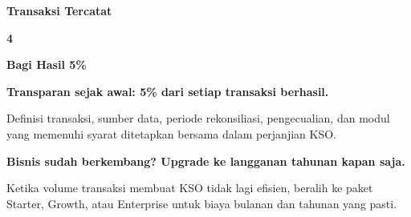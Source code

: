 \documentclass[a4paper]{article}
\begin{document}
\begin{center}
\begin{minipage}[t]{0.23\textwidth}
{\begin{minipage}[t][3.45cm][c]{\dimexpr\linewidth-2\fboxsep\relax}
            \begin{center}{\fontsize{9.5}{12}\selectfont\bfseries\color{BlueDark} Transaksi Tercatat}\par{}\end{center}
        \end{minipage}}%
\end{minipage}%
\hfill
\begin{minipage}[t]{0.23\textwidth}
    \colorbox{EmeraldBg}{%
        \begin{minipage}[t][3.45cm][c]{\dimexpr\linewidth-2\fboxsep\relax}
            \begin{center}{\fontsize{20}{24}\selectfont\bfseries\color{EmeraldPrimary} 4}\end{center}\vspace{2pt}
            \begin{center}{\fontsize{9.5}{12}\selectfont\bfseries\color{EmeraldDark} Bagi Hasil 5\%}\par{}\end{center}
        \end{minipage}}%
\end{minipage}
\end{center}

\vspace{8pt}

{\setlength{\fboxsep}{8pt}\setlength{\fboxrule}{0pt}%
\noindent\colorbox{BluePrimary}{%
    \begin{minipage}{\dimexpr\textwidth-2\fboxsep\relax}
        \centering
        {\fontsize{9.5}{12}\selectfont\bfseries\color{White} Transparan sejak awal: 5\% dari setiap transaksi berhasil.}\par\vspace{2pt}
        {\fontsize{8.5}{11}\selectfont\color{BlueMid} Definisi transaksi, sumber data, periode rekonsiliasi, pengecualian, dan modul yang memenuhi syarat ditetapkan bersama dalam perjanjian KSO.}
    \end{minipage}}}

\vspace{8pt}

{\setlength{\fboxsep}{8pt}\setlength{\fboxrule}{0pt}%
\noindent\colorbox{EmeraldBg}{%
    \begin{minipage}{\dimexpr\textwidth-2\fboxsep\relax}
        \centering
        {\fontsize{9}{12}\selectfont\bfseries\color{EmeraldDark} Bisnis sudah berkembang? Upgrade ke langganan tahunan kapan saja.}\par\vspace{1pt}
        {\fontsize{8.5}{11}\selectfont\color{TextDark} Ketika volume transaksi membuat KSO tidak lagi efisien, beralih ke paket Starter, Growth, atau Enterprise untuk biaya bulanan dan tahunan yang pasti.}
    \end{minipage}}}
\end{document}
